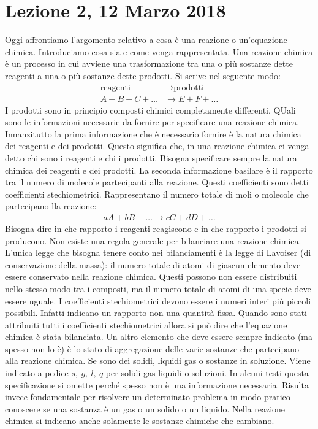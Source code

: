 \documentclass[../AppuntiChimica]{subfiles}
\begin{document}
	\section{Lezione 2, 12 Marzo 2018}

	Oggi affrontiamo l'argomento relativo a cosa è una reazione o un'equazione chimica. Introduciamo cosa sia e come venga rappresentata. Una reazione chimica è un processo in cui avviene una trasformazione tra una o più sostanze dette reagenti a una o più sostanze dette prodotti. Si scrive nel seguente modo:
	\begin{align}
	\text{reagenti}&\to \text{prodotti} \\
	A+B+C+\dots&\to E+F+\dots
	\end{align}
	I prodotti sono in principio composti chimici completamente differenti. QUali sono le informazioni necessarie da fornire per specificare una reazione chimica. Innanzitutto la prima informazione che è necessario fornire è la natura chimica dei reagenti e dei prodotti. Questo significa che, in una reazione chimica ci venga detto chi sono i reagenti e chi i prodotti. Bisogna specificare sempre la natura chimica dei reagenti e dei prodotti. La seconda informazione basilare è il rapporto tra il numero di molecole partecipanti alla reazione. Questi coefficienti sono detti coefficienti stechiometrici. Rappresentano il numero totale di moli o molecole che partecipano lla reazione:
	\begin{gather}
	aA+bB+\dots\to cC+dD+\dots
	\end{gather}
	Bisogna dire in che rapporto i reagenti reagiscono e in che rapporto i prodotti si producono. Non esiste una regola generale per bilanciare una reazione chimica. L'unica legge che bisogna tenere conto nei bilanciamenti è la legge di Lavoiser (di conservazione della massa): il numero totale di atomi di giascun elemento deve essere conservato nella reazione chimica. Questi possono non essere distribuiti nello stesso modo tra i composti, ma il numero totale di atomi di una specie deve essere uguale. I coefficienti stechiometrici devono essere i numeri interi più piccoli possibili. Infatti indicano un rapporto non una quantità fissa. Quando sono stati attribuiti tutti i coefficienti stechiometrici allora si può dire che l'equazione chimica è stata bilanciata. Un altro elemento che deve essere sempre indicato (ma spesso non lo è) è lo stato di aggregazione delle varie sostanze che partecipano alla reazione chimica. Se sono dei solidi, liquidi gas o sostanze in soluzione. Viene indicato a pedice $ s,\ g,\ l,\ q $ per solidi gas liquidi o soluzioni. In alcuni testi questa specificazione si omette perché spesso non è una informazione necessaria. Risulta invece fondamentale per risolvere un determinato problema in modo pratico conoscere se una sostanza è un gas o un solido o un liquido. Nella reazione chimica si indicano anche solamente le sostanze chimiche che cambiano. 
	
\end{document}
